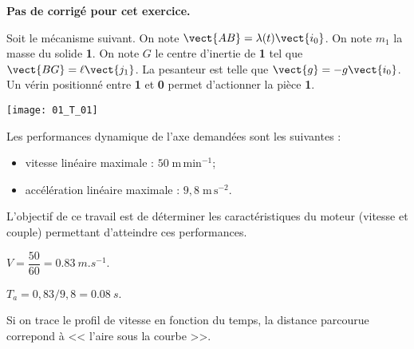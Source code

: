 \normaltrue
\correctionfalse


\setcounter{numques}{0}
\ifcorrection
\else
\textbf{Pas de corrigé pour cet exercice.}
\fi

\ifprof
\else
Soit le mécanisme suivant. On note $\vect{AB}=\lambda(t)\vect{i_0}$. On note $m_1$ la masse du solide \textbf{1}.
On note $G$ le centre d'inertie de \textbf{1} tel que $\vect{BG}=\ell \vect{j_1}$. La pesanteur est telle que $\vect{g}=-g\vect{i_0}$. Un vérin positionné entre \textbf{1} et \textbf{0} permet d'actionner la pièce \textbf{1}. 
\begin{center}
\texttt{[image: 01\_T\_01]}
\end{center}



Les performances dynamique de l'axe demandées sont les suivantes : 
\begin{itemize}
\item vitesse linéaire maximale : $50 \; \text{m}\,\text{min}^{-1}$;
\item accélération linéaire maximale : $9,8 \; \text{m}\, \text{s}^{-2}$.
\end{itemize}

\begin{obj}
L'objectif de ce travail est de déterminer les caractéristiques du moteur (vitesse et couple) permettant d'atteindre ces performances.
\end{obj}
\fi

\ifprof
$V = \dfrac{50}{60} = \SI{0,83}{m.s^{-1}}$.
\else
\fi

\ifprof
$T_a =0,83/9,8 = \SI{0,08}{s}$.


\else
\fi

\ifprof
Si on trace le profil de vitesse en fonction du temps, la distance parcourue correpond à << l'aire sous la courbe >>. 

